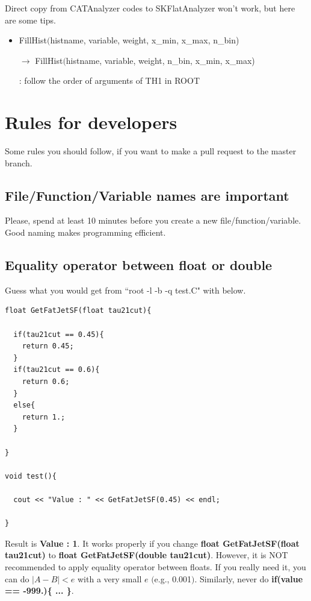 \documentclass[12pt, a4paper, titlepage]{article}
\begin{document}
Direct copy from CATAnalyzer codes to SKFlatAnalyzer won't work, but here are some tips.

\begin{itemize}

\item FillHist$($histname, variable, weight, x\_min, x\_max, n\_bin) \par
      $\rightarrow$ FillHist$($histname, variable, weight, n\_bin, x\_min, x\_max) \par
      : follow the order of arguments of TH1 in ROOT

\end{itemize}

\clearpage

\section{Rules for developers}

Some rules you should follow, if you want to make a pull request to the master branch.

\subsection{File/Function/Variable names are important}

Please, spend at least 10 minutes before you create a new file/function/variable.
Good naming makes programming efficient.

\subsection{Equality operator between float or double}

Guess what you would get from ``root -l -b -q test.C" with below.

\begin{lstlisting}
float GetFatJetSF(float tau21cut){
  
  if(tau21cut == 0.45){
    return 0.45;
  }
  if(tau21cut == 0.6){
    return 0.6;
  }
  else{
    return 1.;
  }

}

void test(){

  cout << "Value : " << GetFatJetSF(0.45) << endl;

}

\end{lstlisting}

Result is \textbf{Value : 1}.
It works properly if you change \textbf{float GetFatJetSF(float tau21cut)} to \textbf{float GetFatJetSF(double tau21cut)}.
However, it is NOT recommended to apply equality operator between floats.
If you really need it, you can do $|A-B|<e$ with a very small $e$ $($e.g., 0.001$)$.
Similarly, never do \textbf{if(value == -999.)\{ ... \}}.
\end{document}
